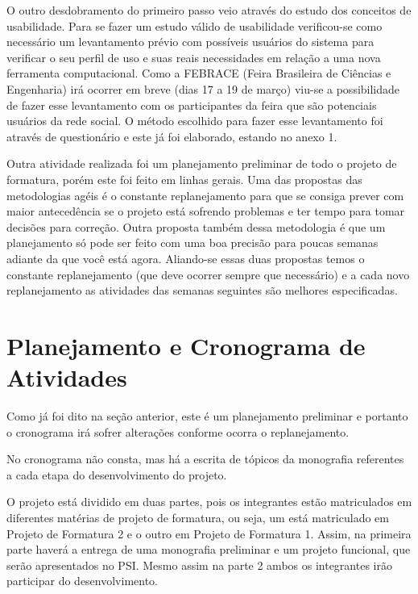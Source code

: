 \documentclass[a4paper,12pt,font=plain,header=plain]{abnt}
\begin{document}
	O outro desdobramento do primeiro passo veio através do estudo dos conceitos de usabilidade. Para se fazer um estudo válido de usabilidade verificou-se como necessário um levantamento prévio com possíveis usuários do sistema para verificar o seu perfil de uso e suas reais necessidades em relação a uma nova ferramenta computacional. Como a FEBRACE (Feira Brasileira de Ciências e Engenharia) irá ocorrer em breve (dias 17 a 19 de março) viu-se a possibilidade de fazer esse levantamento com os participantes da feira que são potenciais usuários da rede social. O método escolhido para fazer esse levantamento foi através de questionário e este já foi elaborado, estando no anexo 1.

	Outra atividade realizada foi um planejamento preliminar de todo o projeto de formatura, porém este foi feito em linhas gerais. Uma das propostas das metodologias agéis é o constante replanejamento para que se consiga prever com maior antecedência se o projeto está sofrendo problemas e ter tempo para tomar decisões para correção. Outra proposta também dessa metodologia é que um planejamento só pode ser feito com uma boa precisão para poucas semanas adiante da que você está agora. Aliando-se essas duas propostas temos o constante replanejamento (que deve ocorrer sempre que necessário) e a cada novo replanejamento as atividades das semanas seguintes são melhores especificadas.

  \section{Planejamento e Cronograma de Atividades}

	Como já foi dito na seção anterior, este é um planejamento preliminar e portanto o cronograma irá sofrer alterações conforme ocorra o replanejamento.

	No cronograma não consta, mas há a escrita de tópicos da monografia referentes a cada etapa do desenvolvimento do projeto.

	O projeto está dividido em duas partes, pois os integrantes estão matriculados em diferentes matérias de projeto de formatura, ou seja, um está matriculado em Projeto de Formatura 2 e o outro em Projeto de Formatura 1. Assim, na primeira parte haverá a entrega de uma monografia preliminar e um projeto funcional, que serão apresentados no PSI. Mesmo assim na parte 2 ambos os integrantes irão participar do desenvolvimento.
	
\end{document}
